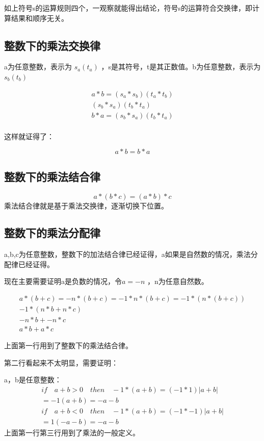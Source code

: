 \documentclass[12pt,oneside]{book}
\begin{document}
如上符号s的运算规则四个，一观察就能得出结论，符号s的运算符合交换律，即计算结果和顺序无关。


\subsection{整数下的乘法交换律}
a为任意整数，表示为 $s_a(t_a)$ ，s是其符号，t是其正数值。b为任意整数，表示为 $s_b(t_b)$ 

\begin{align*}
a*b =  (s_a*s_b)(t_a*t_b)\\
(s_b*s_a)(t_b*t_a)\\
b*a =  (s_b*s_a)(t_b*t_a)\\
\end{align*}

这样就证得了：

\begin{equation}
a * b = b * a
\end{equation}


\subsection{整数下的乘法结合律}
\begin{equation}
a * (b * c) = (a * b) * c
\end{equation}
乘法结合律就是基于乘法交换律，逐渐切换下位置。

\subsection{整数下的乘法分配律}
a,b,c为任意整数，整数下的加法结合律已经证得，a如果是自然数的情况，乘法分配律已经证得。

现在主要需要证明a是负数的情况，令$a=-n$ ，n为任意自然数。

\begin{align*}
a*(b+c) = -n*(b+c) = -1*n*(b+c) = -1*(n * (b+c))\\
-1 * (n*b+n*c)\\
-n*b + -n*c\\
a*b + a*c
\end{align*}

上面第一行用到了整数下的乘法结合律。

第二行看起来不太明显，需要证明：

a，b是任意整数：
\begin{align*}
if \quad a+b > 0 \quad then \quad -1 * (a+b) = (-1*1)|a+b|\\
= -1(a+b) = -a - b \\
if \quad a+b <0  \quad then \quad -1 * (a+b) = (-1*-1)|a+b|\\ 
= 1(-a-b) = -a-b
\end{align*}
上面第一行第三行用到了乘法的一般定义。
\end{document}
